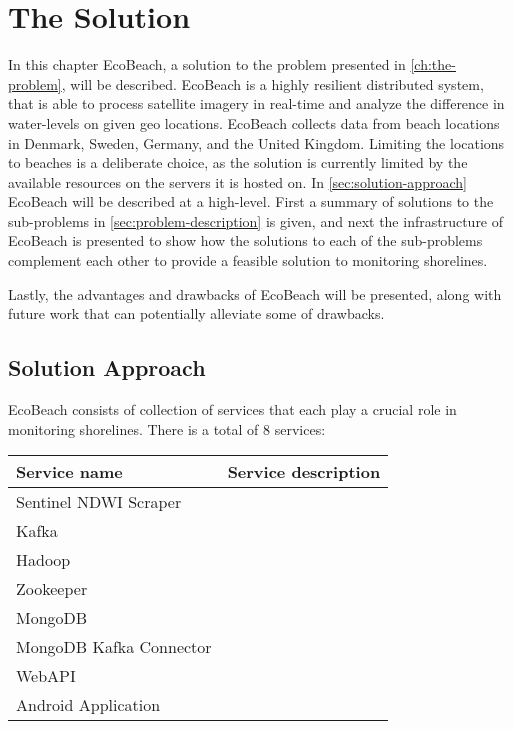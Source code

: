 \chapter{The Solution}

In this chapter EcoBeach, a solution to the problem presented in \autoref{ch:the-problem}, will be described. EcoBeach is a highly resilient distributed system, that is able to process satellite imagery in real-time and analyze the difference in water-levels on given geo locations.
EcoBeach collects data from beach locations in Denmark, Sweden, Germany, and the United Kingdom. Limiting the locations to beaches is a deliberate choice, as the solution is currently limited by the available resources on the servers it is hosted on.\medbreak
\noindent
In \autoref{sec:solution-approach}  EcoBeach will be described at a high-level. First a summary of solutions to the sub-problems in \autoref{sec:problem-description} is given, and next the infrastructure of EcoBeach is presented to show how the solutions to each of the sub-problems complement each other to provide a feasible solution to monitoring shorelines.

Lastly, the advantages and drawbacks of EcoBeach will be presented, along with future work that can potentially alleviate some of drawbacks.

\section{Solution Approach}\label{sec:solution-approach}

EcoBeach consists of collection of services that each play a crucial role in monitoring shorelines. There is a total of 8 services: 

\begin{table}[]
    \begin{tabular}{|l|l|}
        \hline
        \textbf{Service name}   & \textbf{Service description} \\ \hline
        Sentinel NDWI Scraper   &                              \\\hline
        Kafka                   &                              \\\hline
        Hadoop                  &                              \\\hline
        Zookeeper               &                              \\\hline
        MongoDB                 &                              \\\hline
        MongoDB Kafka Connector &                              \\\hline
        WebAPI                  &                              \\\hline
        Android Application     &                              \\\hline
    \end{tabular}
\end{table}


